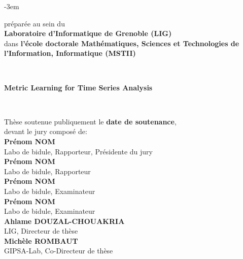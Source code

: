 \begin{titlepage}
\begin{adjustwidth}{}{-3em}
\begin{flushleft}
\vfill

\begin{flushright}
\begin{minipage}{\leftshift}
\begin{flushleft}
{préparée au sein du \\\textbf{Laboratoire d'Informatique de Grenoble (LIG)}\\
dans \textbf{l'école doctorale Mathématiques, Sciences et Technologies de l'Information, Informatique (MSTII)}}
\end{flushleft}
\end{minipage}
\end{flushright}~~\\[1cm]

\vfill

\begin{flushright}
\begin{minipage}{\leftshift}
\begin{flushleft}
{ \Huge \bfseries Metric Learning for Time Series Analysis}
\end{flushleft}
\end{minipage}
\end{flushright}~~\\[1cm]

\vfill

\begin{flushright}
\begin{minipage}{\leftshift}
\begin{flushleft}
{Thèse soutenue publiquement le \textbf{date de soutenance},\\ devant le jury composé de:}\\[\espvert]
{\textbf{Prénom NOM}}\\
{Labo de bidule, Rapporteur, Présidente du jury}\\
{\textbf{Prénom NOM}}\\
{Labo de bidule, Rapporteur}\\
{\textbf{Prénom NOM}}\\
{Labo de bidule, Examinateur}\\
{\textbf{Prénom NOM}}\\
{Labo de bidule, Examinateur}\\
{\textbf{Ahlame DOUZAL-CHOUAKRIA}}\\
{LIG, Directeur de thèse}\\
{\textbf{Michèle ROMBAUT}}\\
{GIPSA-Lab, Co-Directeur de thèse}\\
\end{flushleft}
\end{minipage}
\end{flushright}
\vfill
\end{flushleft}
\end{adjustwidth}
\end{titlepage}
\setlength{\parskip}{10pt}
\endgroup


